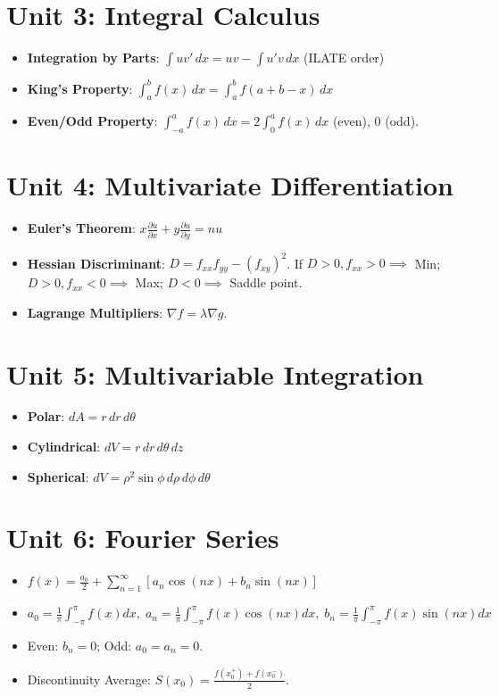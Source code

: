 \section{Unit 3: Integral Calculus}
\begin{itemize}[leftmargin=1.5em]
    \item \textbf{Integration by Parts}: $\int u v'\,dx = uv - \int u' v\,dx$ (ILATE order)
    \item \textbf{King's Property}: $\int_a^b f(x)\,dx = \int_a^b f(a+b-x)\,dx$
    \item \textbf{Even/Odd Property}: $\int_{-a}^a f(x)\,dx = 2\int_0^a f(x)\,dx$ (even), $0$ (odd).
\end{itemize}

\section{Unit 4: Multivariate Differentiation}
\begin{itemize}[leftmargin=1.5em]
    \item \textbf{Euler's Theorem}: $x \frac{\partial u}{\partial x} + y \frac{\partial u}{\partial y} = n u$
    \item \textbf{Hessian Discriminant}: $D = f_{xx}f_{yy} - (f_{xy})^2$. If $D > 0, f_{xx} > 0 \implies$ Min; $D > 0, f_{xx} < 0 \implies$ Max; $D < 0 \implies$ Saddle point.
    \item \textbf{Lagrange Multipliers}: $\nabla f = \lambda \nabla g$.
\end{itemize}

\section{Unit 5: Multivariable Integration}
\begin{itemize}[leftmargin=1.5em]
    \item \textbf{Polar}: $dA = r\,dr\,d\theta$
    \item \textbf{Cylindrical}: $dV = r\,dr\,d\theta\,dz$
    \item \textbf{Spherical}: $dV = \rho^2 \sin\phi\,d\rho\,d\phi\,d\theta$
\end{itemize}

\section{Unit 6: Fourier Series}
\begin{itemize}[leftmargin=1.5em]
    \item $f(x) = \frac{a_0}{2} + \sum_{n=1}^\infty [a_n \cos(nx) + b_n \sin(nx)]$
    \item $a_0 = \frac{1}{\pi}\int_{-\pi}^\pi f(x)dx, \; a_n = \frac{1}{\pi}\int_{-\pi}^\pi f(x)\cos(nx)dx, \; b_n = \frac{1}{\pi}\int_{-\pi}^\pi f(x)\sin(nx)dx$
    \item Even: $b_n = 0$; Odd: $a_0 = a_n = 0$.
    \item Discontinuity Average: $S(x_0) = \frac{f(x_0^+) + f(x_0^-)}{2}$.
\end{itemize}
